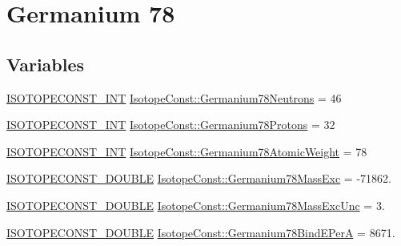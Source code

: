\hypertarget{group___isotope_const-_germanium-_ge78}{}\section{Germanium 78}
\label{group___isotope_const-_germanium-_ge78}
\subsection*{Variables}
\begin{DoxyCompactItemize}
\item 
\mbox{\hyperlink{group___isotope_const-_macros_ga5f18360b3e99483a35c32d789e62621c}{I\+S\+O\+T\+O\+P\+E\+C\+O\+N\+S\+T\+\_\+\+I\+NT}} \mbox{\hyperlink{group___isotope_const-_germanium-_ge78_gaa4d2f73d1e91c5aa7791abaa4ba997f5}{Isotope\+Const\+::\+Germanium78\+Neutrons}} = 46
\item 
\mbox{\hyperlink{group___isotope_const-_macros_ga5f18360b3e99483a35c32d789e62621c}{I\+S\+O\+T\+O\+P\+E\+C\+O\+N\+S\+T\+\_\+\+I\+NT}} \mbox{\hyperlink{group___isotope_const-_germanium-_ge78_ga3d881c8dfbe9b98a10dd4c892b9fdf96}{Isotope\+Const\+::\+Germanium78\+Protons}} = 32
\item 
\mbox{\hyperlink{group___isotope_const-_macros_ga5f18360b3e99483a35c32d789e62621c}{I\+S\+O\+T\+O\+P\+E\+C\+O\+N\+S\+T\+\_\+\+I\+NT}} \mbox{\hyperlink{group___isotope_const-_germanium-_ge78_ga13a3055108555fbe22ee98f13b83ce77}{Isotope\+Const\+::\+Germanium78\+Atomic\+Weight}} = 78
\item 
\mbox{\hyperlink{group___isotope_const-_macros_ga8f45a7272ce02c0b4c65c44636ed719a}{I\+S\+O\+T\+O\+P\+E\+C\+O\+N\+S\+T\+\_\+\+D\+O\+U\+B\+LE}} \mbox{\hyperlink{group___isotope_const-_germanium-_ge78_ga6565e5bf5600f27e5af458724cced692}{Isotope\+Const\+::\+Germanium78\+Mass\+Exc}} = -\/71862.
\item 
\mbox{\hyperlink{group___isotope_const-_macros_ga8f45a7272ce02c0b4c65c44636ed719a}{I\+S\+O\+T\+O\+P\+E\+C\+O\+N\+S\+T\+\_\+\+D\+O\+U\+B\+LE}} \mbox{\hyperlink{group___isotope_const-_germanium-_ge78_gaf04d5ab53fa808f0d0287adcbc688582}{Isotope\+Const\+::\+Germanium78\+Mass\+Exc\+Unc}} = 3.
\item 
\mbox{\hyperlink{group___isotope_const-_macros_ga8f45a7272ce02c0b4c65c44636ed719a}{I\+S\+O\+T\+O\+P\+E\+C\+O\+N\+S\+T\+\_\+\+D\+O\+U\+B\+LE}} \mbox{\hyperlink{group___isotope_const-_germanium-_ge78_gad7ae141a7c3f39e4d08d2afcd2ab88a3}{Isotope\+Const\+::\+Germanium78\+Bind\+E\+PerA}} = 8671.
\item 

\end{DoxyCompactItemize}
